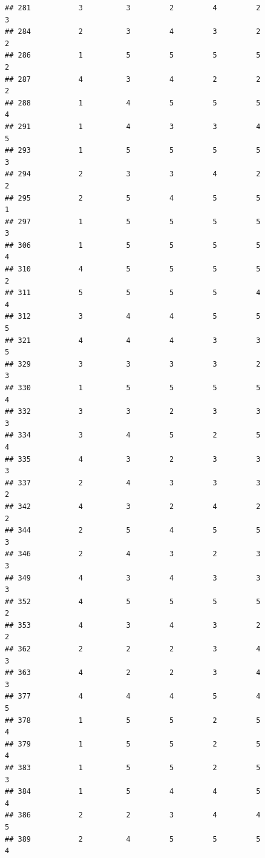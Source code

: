 \documentclass[
]{article}
\begin{document}
\begin{verbatim}
## 281           3          3         2         4         2             3
## 284           2          3         4         3         2             2
## 286           1          5         5         5         5             2
## 287           4          3         4         2         2             2
## 288           1          4         5         5         5             4
## 291           1          4         3         3         4             5
## 293           1          5         5         5         5             3
## 294           2          3         3         4         2             2
## 295           2          5         4         5         5             1
## 297           1          5         5         5         5             3
## 306           1          5         5         5         5             4
## 310           4          5         5         5         5             2
## 311           5          5         5         5         4             4
## 312           3          4         4         5         5             5
## 321           4          4         4         3         3             5
## 329           3          3         3         3         2             3
## 330           1          5         5         5         5             4
## 332           3          3         2         3         3             3
## 334           3          4         5         2         5             4
## 335           4          3         2         3         3             3
## 337           2          4         3         3         3             2
## 342           4          3         2         4         2             2
## 344           2          5         4         5         5             3
## 346           2          4         3         2         3             3
## 349           4          3         4         3         3             3
## 352           4          5         5         5         5             2
## 353           4          3         4         3         2             2
## 362           2          2         2         3         4             3
## 363           4          2         2         3         4             3
## 377           4          4         4         5         4             5
## 378           1          5         5         2         5             4
## 379           1          5         5         2         5             4
## 383           1          5         5         2         5             3
## 384           1          5         4         4         5             4
## 386           2          2         3         4         4             5
## 389           2          4         5         5         5             4

\end{verbatim}
\end{document}
